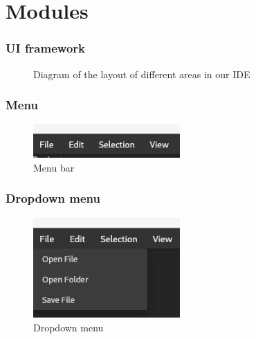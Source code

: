 \section{Modules}
\SectionPage

\begin{frame}
  \frametitle{UI framework}
  \begin{figure}[H]
    \centering
    
    \caption{
      Diagram of the layout of different areas in our IDE
    }
    \label{fig:ideLayout}
  \end{figure}
\end{frame}

\begin{frame}
  \frametitle{Menu}
  \begin{figure}
    \centering
    \includegraphics[width=0.5\textwidth]{./pics/menu-bar.png}
    \caption{
      Menu bar
    }
  \end{figure}
\end{frame}

\begin{frame}
  \frametitle{Dropdown menu}
  \begin{figure}
    \centering
    \includegraphics[width=0.5\textwidth]{./pics/menu-dropdown.png}
    \caption{
      Dropdown menu
    }
  \end{figure}
\end{frame}

